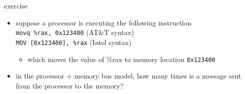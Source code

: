 \begin{frame}{exercise}
    \begin{itemize}
    \item suppose a processor is executing the following instruction \\
        \texttt{movq \%rax, 0x123400} (AT\&T syntax) \\
        \texttt{MOV [0x123400], \%rax} (Intel syntax)
        \begin{itemize}
            \item which moves the value of \%rax to memory location \texttt{0x123400}
        \end{itemize}
    \item in the processor + memory bus model, how many times is a message sent
        from the processor to the memory?
    \end{itemize}
\end{frame}
